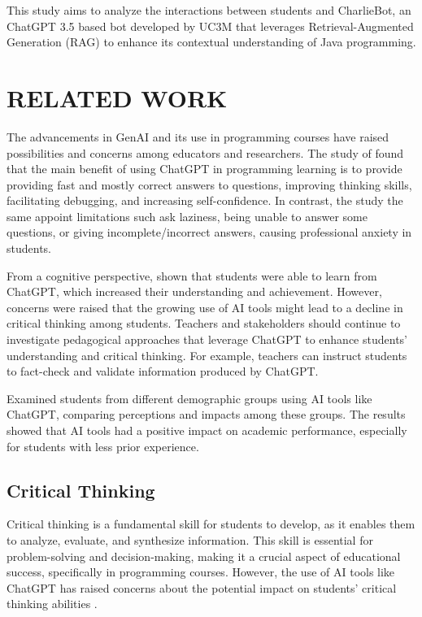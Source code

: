 \documentclass[a4paper,twoside]{article}
\begin{document}

This study aims to analyze the interactions between students and CharlieBot,
an ChatGPT 3.5 based bot developed by UC3M that leverages Retrieval-Augmented
Generation (RAG) to enhance its contextual understanding of Java programming.

\section{\uppercase{Related Work}}

The advancements in GenAI and its use in programming courses have raised
possibilities and concerns among educators and researchers. The study of
\cite{Yilmaz23} found that the main benefit of using ChatGPT in programming
learning is to provide providing fast and mostly correct answers to questions,
improving thinking skills, facilitating debugging, and increasing
self-confidence. In contrast, the study the same appoint limitations such ask
laziness, being unable to answer some questions, or giving incomplete/incorrect
answers, causing professional anxiety in students.

From a cognitive perspective, \cite{Lo24} shown that students were able to
learn from ChatGPT, which increased their understanding and achievement.
However, concerns were raised that the growing use of AI tools might lead to a
decline in critical thinking among students. Teachers and stakeholders should
continue to investigate pedagogical approaches that leverage ChatGPT to enhance
students' understanding and critical thinking. For example, teachers can
instruct students to fact-check and validate information produced by ChatGPT.

Examined students from different demographic groups using AI tools like
ChatGPT, comparing perceptions and impacts among these groups. The results
showed that AI tools had a positive impact on academic performance, especially
for students with less prior experience.

\subsection{Critical Thinking}

Critical thinking is a fundamental skill for students to develop, as it enables
them to analyze, evaluate, and synthesize information. This skill is essential
for problem-solving and decision-making, making it a crucial aspect of
educational success, specifically in programming courses. However, the use of AI
tools like ChatGPT has raised concerns about the potential impact on students'
critical thinking abilities \cite{Murillo23} \cite{cai23} \cite{chan23}.
\end{document}
